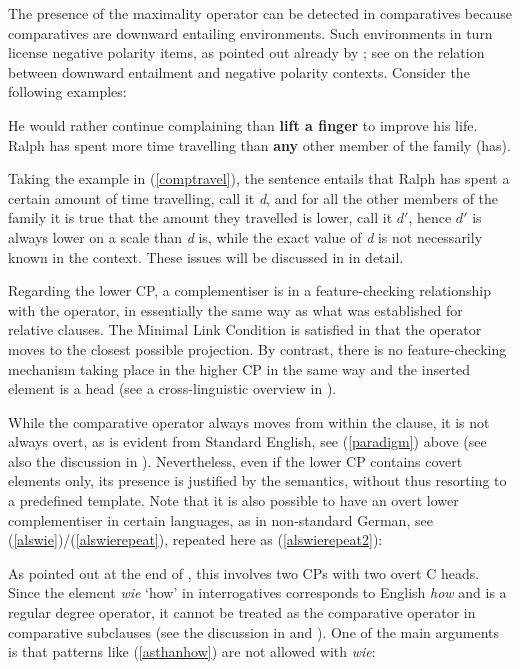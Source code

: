 The presence of the maximality operator can be detected in comparatives because comparatives are downward entailing environments. Such environments in turn license negative polarity items, as pointed out already by \citet{seuren1973}; see \citet{ladusaw1979diss} on the relation between downward entailment and negative polarity contexts. Consider the following examples:

\ea
\ea He would rather continue complaining than \textbf{lift a finger} to improve his life.
\ex Ralph has spent more time travelling than \textbf{any} other member of the family (has). \label{comptravel}
\z 
\z

Taking the example in (\ref{comptravel}), the sentence entails that Ralph has spent a certain amount of time travelling, call it \textit{d}, and for all the other members of the family it is true that the amount they travelled is lower, call it $d'$, hence $d'$ is always lower on a scale than \textit{d} is, while the exact value of \textit{d} is not necessarily known in the context. These issues will be discussed in  in detail.

Regarding the lower CP, a complementiser is in a feature-checking relationship with the operator, in essentially the same way as what was established for relative clauses. The Minimal Link Condition is satisfied in that the operator moves to the closest possible projection. By contrast, there is no feature-checking mechanism taking place in the higher CP in the same way and the inserted element is a head (see a cross-linguistic overview in \citealt{bacskaiatkari2016alh}).

While the comparative operator always moves from within the clause, it is not always overt, as is evident from Standard English, see (\ref{paradigm}) above (see also the discussion in \citealt[98--129]{bacskaiatkari2014diss}). Nevertheless, even if the lower CP contains covert elements only, its presence is justified by the semantics, without thus resorting to a predefined template. Note that it is also possible to have an overt lower complementiser in certain languages, as in non-standard German, see (\ref{alswie})/(\ref{alswierepeat}), repeated here as (\ref{alswierepeat2}):

\z

As pointed out at the end of , this involves two CPs with two overt C heads. Since the element \textit{wie} `how' in interrogatives corresponds to English \textit{how} and is a regular degree operator, it cannot be treated as the comparative operator in comparative subclauses (see the discussion in \citealt[497--499]{bacskaiatkari2014dia} and \citealt[117--118, 223--226]{bacskaiatkari2014diss}). One of the main arguments is that patterns like (\ref{asthanhow}) are not allowed with \textit{wie}:

